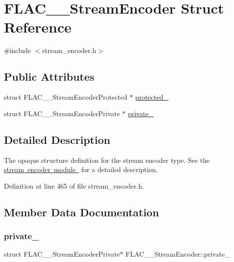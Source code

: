 \hypertarget{struct_f_l_a_c_____stream_encoder}{}\section{F\+L\+A\+C\+\_\+\+\_\+\+Stream\+Encoder Struct Reference}
\label{struct_f_l_a_c_____stream_encoder}


{\ttfamily \#include $<$stream\+\_\+encoder.\+h$>$}

\subsection*{Public Attributes}
\begin{DoxyCompactItemize}
\item 
struct F\+L\+A\+C\+\_\+\+\_\+\+Stream\+Encoder\+Protected $\ast$ \mbox{\hyperlink{struct_f_l_a_c_____stream_encoder_a2820d2ad5c6395289b2abc7dc7399f76}{protected\+\_\+}}
\item 
struct F\+L\+A\+C\+\_\+\+\_\+\+Stream\+Encoder\+Private $\ast$ \mbox{\hyperlink{struct_f_l_a_c_____stream_encoder_a6cc84bcaa3049936b459f5f2362b9076}{private\+\_\+}}
\end{DoxyCompactItemize}


\subsection{Detailed Description}
The opaque structure definition for the stream encoder type. See the \mbox{\hyperlink{group__flac__stream__encoder}{stream encoder module }} for a detailed description. 

Definition at line 465 of file stream\+\_\+encoder.\+h.



\subsection{Member Data Documentation}
\mbox{\label{struct_f_l_a_c_____stream_encoder_a6cc84bcaa3049936b459f5f2362b9076}} 
\subsubsection{\texorpdfstring{private\_}{private\_}}
{\footnotesize\ttfamily struct F\+L\+A\+C\+\_\+\+\_\+\+Stream\+Encoder\+Private$\ast$ F\+L\+A\+C\+\_\+\+\_\+\+Stream\+Encoder\+::private\+\_\+}



